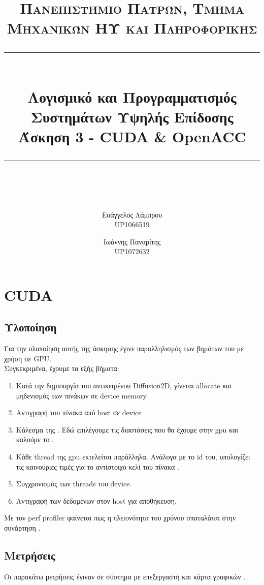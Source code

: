 \documentclass[11pt]{scrartcl} %
\title{	
	\normalfont\normalsize
	\textsc{Πανεπιστήμιο Πατρών, Τμήμα Μηχανικών ΗΥ και Πληροφορικής}\\ %
	\vspace{25pt} %
	\rule{\linewidth}{0.5pt}\\ %
	\vspace{20pt} %
    {\LARGE Λογισμικό και Προγραμματισμός Συστημάτων Υψηλής Επίδοσης\\ Άσκηση 3 - CUDA \& OpenACC}\\ %
	\vspace{12pt} %
	\rule{\linewidth}{2pt}\\ %
	\vspace{12pt} %
}
\author{Ευάγγελος Λάμπρου \\UP1066519 \and Ιωάννης Παναρίτης \\UP1072632} %
\date{} %
\begin{document}
\maketitle 

\section{CUDA}

\subsection{Υλοποίηση}

Για την υλοποίηση αυτής της άσκησης έγινε παραλληλισμός των βημάτων του  με χρήση  σε GPU.\\
Συγκεκριμένα, έχουμε τα εξής βήματα:

\begin{enumerate}
    \item Κατά την δημιουργία του αντικειμένου Diffusion2D, γίνεται allocate και μηδενισμός των πινάκων σε device memory.
    \item Αντιγραφή του πίνακα  από host σε device
    \item Κάλεσμα της . Εδώ επιλέγουμε τις διαστάσεις που θα έχουμε στην gpu και καλούμε το .
    \item Κάθε thread της gpu εκτελείται παράλληλα. Ανάλογα με το id του, υπολογίζει τις καινούριες τιμές για το αντίστοιχο κελί του πίνακα .
    \item Συγχρονισμός των threads του device.
    \item Αντιγραφή των δεδομένων στον host για αποθήκευση.
\end{enumerate}

Με τον perf profiler φαίνεται πως η πλειονότητα του χρόνου σπαταλάται στην συνάρτηση .



\subsection{Μετρήσεις}

Οι παρακάτω μετρήσεις έγιναν σε σύστημα με επεξεργαστή  και κάρτα γραφικών .
\end{document}

